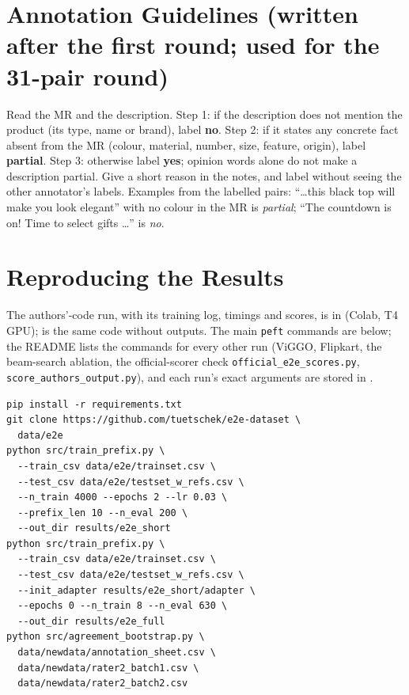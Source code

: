 \documentclass[11pt]{article}
\begin{document}
\section{Annotation Guidelines (written after the first round; used for the 31-pair round)}
\label{app:guidelines}
Read the MR and the description. Step 1: if the description does not mention the product (its type, name or brand), label \textbf{no}. Step 2: if it states any concrete fact absent from the MR (colour, material, number, size, feature, origin), label \textbf{partial}. Step 3: otherwise label \textbf{yes}; opinion words alone do not make a description partial. Give a short reason in the notes, and label without seeing the other annotator's labels. Examples from the labelled pairs: ``\dots this black top will make you look elegant'' with no colour in the MR is \emph{partial}; ``The countdown is on! Time to select gifts \dots'' is \emph{no}.

\section{Reproducing the Results}
\label{app:repro}
The authors'-code run, with its training log, timings and scores, is in  (Colab, T4 GPU);  is the same code without outputs. The main \texttt{peft} commands are below; the README lists the commands for every other run (ViGGO, Flipkart, the beam-search ablation, the official-scorer check \texttt{official\_e2e\_scores.py}, \texttt{score\_authors\_output.py}), and each run's exact arguments are stored in .
{\scriptsize
\begin{verbatim}
pip install -r requirements.txt
git clone https://github.com/tuetschek/e2e-dataset \
  data/e2e
python src/train_prefix.py \
  --train_csv data/e2e/trainset.csv \
  --test_csv data/e2e/testset_w_refs.csv \
  --n_train 4000 --epochs 2 --lr 0.03 \
  --prefix_len 10 --n_eval 200 \
  --out_dir results/e2e_short
python src/train_prefix.py \
  --train_csv data/e2e/trainset.csv \
  --test_csv data/e2e/testset_w_refs.csv \
  --init_adapter results/e2e_short/adapter \
  --epochs 0 --n_train 8 --n_eval 630 \
  --out_dir results/e2e_full
python src/agreement_bootstrap.py \
  data/newdata/annotation_sheet.csv \
  data/newdata/rater2_batch1.csv \
  data/newdata/rater2_batch2.csv
\end{verbatim}
}
\end{document}
